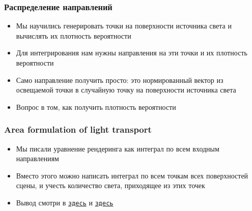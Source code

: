 \documentclass[handout,10pt]{beamer}
\begin{document}
\begin{frame}
\frametitle{Распределение направлений}
\begin{itemize}
\item Мы научились генерировать точки на поверхности источника света и вычислять их плотность вероятности
\pause
\item Для интегрирования нам нужны направления на эти точки и их плотность вероятности
\pause
\item Само направление получить просто: это нормированный вектор из освещаемой точки в случайную точку на поверхности источника света
\pause
\item Вопрос в том, как получить плотность вероятности
\end{itemize}
\end{frame}

\begin{frame}
\frametitle{Area formulation of light transport}
\begin{itemize}
\item Мы писали уравнение рендеринга как интеграл по всем входным направлениям
\pause
\item Вместо этого можно написать интеграл по всем точкам всех поверхностей сцены, и учесть количество света, приходящее из этих точек
\pause
\item Вывод смотри в \href{https://www.cg.tuwien.ac.at/courses/Rendering/2020/slides/04_The_Rendering_Equation_v20200515.pdf}{\texttt{здесь}} и \href{https://www.dgp.toronto.edu/~lessig/dissertation/files/area_formulation.pdf}{\texttt{здесь}}
\end{itemize}
\end{frame}
\end{document}
